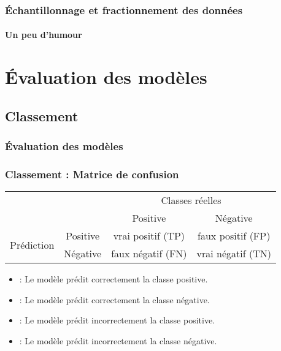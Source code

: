 \documentclass[xcolor=table]{beamer}
\begin{document}
\begin{frame}
	\frametitle{Échantillonnage et fractionnement des données}
	\framesubtitle{Un peu d'humour}
	
		\begin{center}
		\end{center}
	
\end{frame}

\section{Évaluation des modèles}

%	

\subsection{Classement}

\begin{frame}
	\frametitle{Évaluation des modèles}
	\frametitle{Classement : Matrice de confusion}
	
	\begin{tabular}{|c|c|c|c|}
		\cline{3-4}
		\multicolumn{2}{c|}{}& \multicolumn{2}{c|}{Classes réelles} \\
		\cline{3-4}
		\multicolumn{2}{c|}{}& Positive & Négative \\
		\hline
		\multirow{2}{*}{Prédiction} & Positive & vrai positif (TP) & faux positif (FP) \\
		\cline{2-4}
		& Négative & faux négatif (FN) & vrai négatif (TN) \\
		\hline
	\end{tabular}

	\begin{itemize}
		\item {} : Le modèle prédit correctement la classe positive.
		\item {} : Le modèle prédit correctement la classe négative.
		\item {} : Le modèle prédit incorrectement la classe positive.
		\item {} : Le modèle prédit incorrectement la classe négative.
	\end{itemize}
	
\end{frame}
\end{document}
